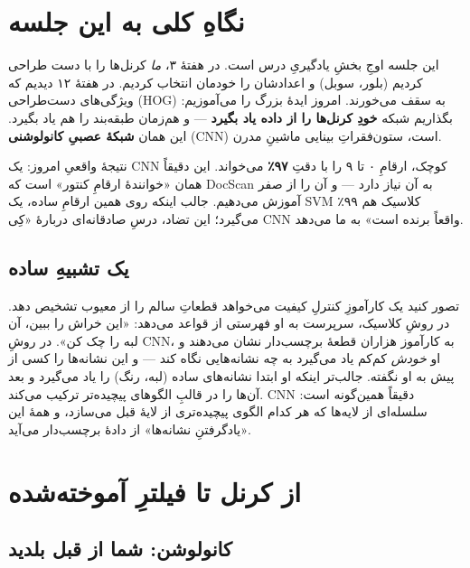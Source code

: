 \documentclass[12pt,a4paper]{article}
\begin{document}

\section*{نگاهِ کلی به این جلسه}

این جلسه اوجِ بخشِ یادگیریِ درس است. در هفتهٔ ۳، \emph{ما} کرنل‌ها را با دست طراحی کردیم (بلور، سوبل) و اعدادشان را خودمان انتخاب کردیم. در هفتهٔ ۱۲ دیدیم که ویژگی‌های دست‌طراحی (HOG) به سقف می‌خورند. امروز ایدهٔ بزرگ را می‌آموزیم: بگذاریم شبکه \textbf{خودِ کرنل‌ها را از داده یاد بگیرد} — و هم‌زمان طبقه‌بند را هم یاد بگیرد. این همان \textbf{شبکهٔ عصبیِ کانولوشنی} (CNN) است، ستون‌فقراتِ بینایی ماشینِ مدرن.

\begin{yaddasht}
نتیجهٔ واقعیِ امروز: یک CNNِ کوچک، ارقامِ ۰ تا ۹ را با دقتِ \textbf{۹۷٪} می‌خواند. این دقیقاً همان «خوانندهٔ ارقامِ کنتور» است که DocScan به آن نیاز دارد — و آن را از صفر آموزش می‌دهیم. جالب اینکه روی همین ارقامِ ساده، یک SVMِ کلاسیک هم ۹۹٪ می‌گیرد؛ این تضاد، درسِ صادقانه‌ای دربارهٔ «کِی CNN واقعاً برنده است» به ما می‌دهد.
\end{yaddasht}

\subsection*{یک تشبیهِ ساده}

تصور کنید یک کارآموزِ کنترلِ کیفیت می‌خواهد قطعاتِ سالم را از معیوب تشخیص دهد. در روشِ کلاسیک، سرپرست به او فهرستی از قواعد می‌دهد: «این خراش را ببین، آن لبه را چک کن». در روشِ CNN، به کارآموز هزاران قطعهٔ برچسب‌دار نشان می‌دهند و او \emph{خودش} کم‌کم یاد می‌گیرد به چه نشانه‌هایی نگاه کند — و این نشانه‌ها را کسی از پیش به او نگفته. جالب‌تر اینکه او ابتدا نشانه‌های ساده (لبه، رنگ) را یاد می‌گیرد و بعد آن‌ها را در قالبِ الگوهای پیچیده‌تر ترکیب می‌کند. CNN دقیقاً همین‌گونه است: سلسله‌ای از لایه‌ها که هر کدام الگوی پیچیده‌تری از لایهٔ قبل می‌سازد، و همهٔ این «یادگرفتنِ نشانه‌ها» از دادهٔ برچسب‌دار می‌آید.

\section{از کرنل تا فیلترِ آموخته‌شده}

\subsection{کانولوشن: شما از قبل بلدید}
\end{document}
